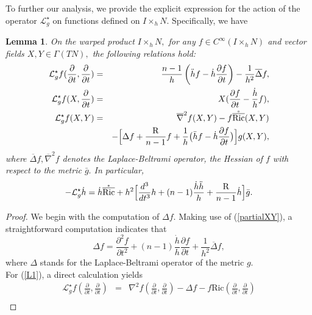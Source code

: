 \documentclass[10pt,leqno,oneside]{amsart}
\newtheorem{Lem}{Lemma}
\begin{document}
{          To further our analysis, we provide the explicit expression for the action of the operator $\mathcal{L}_g^{\star}$ on functions defined on $I\times_hN$. Specifically, we have
    \begin{Lem}\label{Lgh}
           On the warped product $I\times_hN,$ for any $f\in C^\infty(I\times_hN)$ and vector fields $X, Y\in\Gamma(TN),$ the following relations hold:
           \begin{eqnarray}\label{L1}
           \mathcal{L}_g^{\star}f(\frac{\partial}{\partial t},\frac{\partial}{\partial t}) &=&\frac{n-1}{h}\left(\ddot{h}f-\dot{h}\frac{\partial f}{\partial t}\right)-\frac{1}{h^2}\overline{\Delta}f, \\\label{L2}
           \mathcal{L}_g^{\star}f(X,\frac{\partial}{\partial t}) &=&X(\frac{\partial f}{\partial t}-\frac{\dot{h}}{h}f), \\\label{L3}
           \mathcal{L}_g^{\star}f(X,Y) &=&\overline{\nabla}^2 f(X,Y)-f\mathring{\overline{{\rm{Ric}}}}(X,Y)\\\nonumber
           &&-\Big[\Delta f+\frac{{\rm{R}}}{n-1}f+\frac{1}{h}\big(\ddot{h}f-\dot{h}\frac{\partial f}{\partial t}\big)\Big]g(X,Y),
         \end{eqnarray}
         where $\overline{\Delta}f,\overline{\nabla}^2 f$ denotes the Laplace-Beltrami operator, the Hessian of $f$ with respect to the metric $\bar{g}.$ In particular,
         \begin{equation}\label{Ldoth}
           -\mathcal{L}_g^{\star}\dot{h}=\dot{h}\mathring{\overline{{\rm{Ric}}}}+h^2\Big[\frac{d^3}{dt^3}h+(n-1)\frac{\dot{h}\ddot{h}}{h}+\frac{{\rm{R}}}{n-1}\dot{h}\Big]\bar{g}.
         \end{equation}
    \end{Lem}
    \begin{proof}
          We begin with the computation of $\Delta f.$ Making use of (\ref{partialXY}), a straightforward computation indicates that
         \begin{equation}\label{DeltafRwp}
           \Delta f=\frac{\partial^2f}{\partial t^2}+(n-1)\frac{\dot{h}}{h}\frac{\partial f}{\partial t}+\frac{1}{h^2}\overline{\Delta}f,
         \end{equation}
         where $\Delta$ stands for the Laplace-Beltrami operator of the metric $g.$\\
         For (\ref{L1}), a direct calculation yields
         \begin{eqnarray*}
          \mathcal{L}_g^{\star}f(\frac{\partial}{\partial t},\frac{\partial}{\partial t}) &=& \nabla^2f(\frac{\partial}{\partial t},\frac{\partial}{\partial t})-\Delta f-f\text{Ric}(\frac{\partial}{\partial t},\frac{\partial}{\partial t}) \\

\end{eqnarray*}
\end{proof}}
\end{document}
